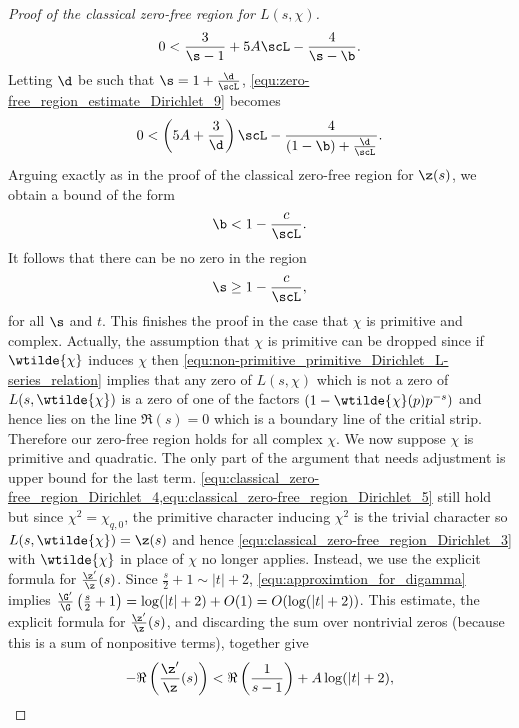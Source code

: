 \begin{proof}[Proof of the classical zero-free region for $L(s,\chi)$]
\begin{equation}
          0 < \frac{3}{\s-1}+5A\scL-\frac{4}{\s-\b}.
        \end{equation}
        Letting $\d$ be such that $\s = 1+\frac{\d}{\scL}$, \cref{equ:zero-free_region_estimate_Dirichlet_9} becomes
        \[
          0 < \left(5A+\frac{3}{\d}\right)\scL-\frac{4}{(1-\b)+\frac{\d}{\scL}}.
        \]
        Arguing exactly as in the proof of the classical zero-free region for $\z(s)$, we obtain a bound of the form
        \begin{equation}\label{equ:zero-free_region_estimate_Dirichlet_beta_bound}
          \b < 1-\frac{c}{\scL}.
        \end{equation}
        It follows that there can be no zero in the region
        \begin{equation}\label{equ:zero-free_region_estimate_Dirichlet_sigma_bound}
          \s \ge 1-\frac{c}{\scL},
        \end{equation}
        for all $\s$ and $t$. This finishes the proof in the case that $\chi$ is primitive and complex. Actually, the assumption that $\chi$ is primitive can be dropped since if $\wtilde{\chi}$ induces $\chi$ then \cref{equ:non-primitive_primitive_Dirichlet_L-series_relation} implies that any zero of $L(s,\chi)$ which is not a zero of $L(s,\wtilde{\chi})$ is a zero of one of the factors $(1-\wtilde{\chi}(p)p^{-s})$ and hence lies on the line $\Re(s) = 0$ which is a boundary line of the critial strip. Therefore our zero-free region holds for all complex $\chi$. We now suppose $\chi$ is primitive and quadratic. The only part of the argument that needs adjustment is upper bound for the last term. \cref{equ:classical_zero-free_region_Dirichlet_4,equ:classical_zero-free_region_Dirichlet_5} still hold but since $\chi^{2} = \chi_{q,0}$, the primitive character inducing $\chi^{2}$ is the trivial character so $L(s,\wtilde{\chi}) = \z(s)$ and hence \cref{equ:classical_zero-free_region_Dirichlet_3} with $\wtilde{\chi}$ in place of $\chi$ no longer applies. Instead, we use the explicit formula for $\frac{\z'}{\z}(s)$. Since $\frac{s}{2}+1 \sim |t|+2$, \cref{equ:approximtion_for_digamma} implies $\frac{\G'}{\G}\left(\frac{s}{2}+1\right) = \log(|t|+2)+O(1) = O(\log(|t|+2))$. This estimate, the explicit formula for $\frac{\z'}{\z}(s)$, and discarding the sum over nontrivial zeros (because this is a sum of nonpositive terms), together give
        \begin{equation}\label{equ:classical_zero-free_region_Dirichlet_10}
          -\Re\left(\frac{\z'}{\z}(s)\right) < \Re\left(\frac{1}{s-1}\right)+A\log(|t|+2),

\end{equation}
\end{proof}
